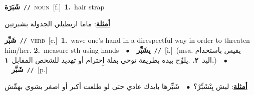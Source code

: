 \documentclass[10pt,a4paper,twoside]{article} %
\begin{document}
\begin{multicols}{2}
{{{{{{\setlength\topsep{0pt}\textbf{\foreignlanguage{arabic}{شَبَرَة}}\ {\color{gray}\texttt{//}\color{black}}\ \textsc{noun}\ [f.]\ \textbf{1.}~hair strap\  \begin{flushright}\color{gray}\foreignlanguage{arabic}{\textbf{\underline{\foreignlanguage{arabic}{أمثلة}}}: ماما اربطيلي الجدولة بشبرتين}\end{flushright}\color{black}} \vspace{2mm}

{\setlength\topsep{0pt}\textbf{\foreignlanguage{arabic}{شَبِّر}}\ {\color{gray}\texttt{//}\color{black}}\ \textsc{verb}\ [c.]\ \textbf{1.}~wave one's hand in a direspectful way in order to threaten him/her.  \textbf{2.}~measure sth using hands\ \ $\bullet$\ \ \setlength\topsep{0pt}\textbf{\foreignlanguage{arabic}{يشَبِّر}}\ {\color{gray}\texttt{//}\color{black}}\ [i.]\ \color{gray}(msa. \foreignlanguage{arabic}{يقيس باستخدام اليد}~\foreignlanguage{arabic}{\textbf{٢.}}  .\foreignlanguage{arabic}{يلوِّح بيده بطريقة توحي بقلة إِحترام أو تهديد للشخص المقابل}~\foreignlanguage{arabic}{\textbf{١.}})\color{black}\ \ $\bullet$\ \ \setlength\topsep{0pt}\textbf{\foreignlanguage{arabic}{شَبَّر}}\ {\color{gray}\texttt{//}\color{black}}\ [p.]\  \begin{flushright}\color{gray}\foreignlanguage{arabic}{\textbf{\underline{\foreignlanguage{arabic}{أمثلة}}}: ليش بِتْشَبِّرْ؟\ $\bullet$\ \  شَبِّرها بايدك عادي حتى لو طلعت أكبر أو اصغر بشوي بهمِّش}\end{flushright}\color{black}} \vspace{2mm}

}}}}}
\end{multicols}
\end{document}
